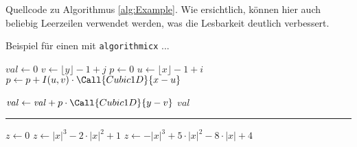 \begin{program}
\caption{Quellcode zu Algorithmus \ref{alg:Example}.
Wie ersichtlich, können hier auch beliebig Leerzeilen verwendet werden, was die
Lesbarkeit deutlich verbessert.}
\label{prog:AlgExample}
\begin{LaTeXCode}[numbers=none]
\begin{algorithm}
\caption{Beispiel für einen mit \texttt{algorithmicx} ... }
\label{alg:Example}

\begin{algorithmic}[1]     %
	
	\smallskip 
	\State $\mathit{val} \gets 0$
	 
		\State $v \gets \lfloor y \rfloor - 1 + j$
		\State $p \gets 0$
		 
			\State $u \gets \lfloor x \rfloor - 1 + i$
			\State $p \gets p + I(u,v) \cdot \Call{Cubic1D}{x - u}$
			\label{alg:wcub1}
		\EndFor
		
		
		\State $\mathit{val} \gets \mathit{val} + p \cdot \Call{Cubic1D}{y - v}$
		\label{alg:wcub2}
	\EndFor
	\State\Return $\mathit{val}$
\EndProcedure

\medskip\hrule\medskip

 
	\State $z \gets 0$
			\State $z \gets |x|^3 - 2 \cdot |x|^2 + 1$
			\State $z \gets -|x|^3 + 5 \cdot |x|^2 - 8 \cdot |x| + 4$
		\EndIf
		\State{}
\EndFunction

\end{algorithmic}
\end{algorithm}
\end{LaTeXCode}
\end{program}


 




